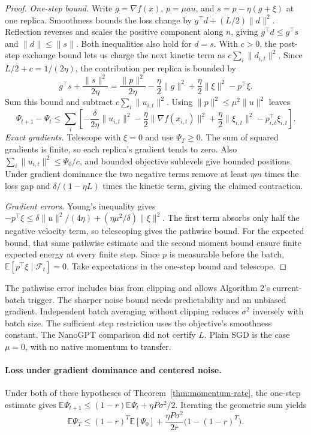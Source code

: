 \documentclass[10pt,letterpaper]{article}
\begin{document}
\begin{proof}
\textit{One-step bound.} Write \(g=\nabla f(x)\), \(p=\mu a u\), and \(s=p-\eta(g+\xi)\) at one replica. Smoothness bounds the loss change by \(g^\top d+(L/2)\|d\|^2\). Reflection reverses and scales the positive component along \(n\), giving \(g^\top d\le g^\top s\) and \(\|d\|\le\|s\|\). Both inequalities also hold for \(d=s\). With \(c>0\), the post-step exchange bound lets us charge the next kinetic term as \(c\sum_i\|d_{i,t}\|^2\). Since \(L/2+c=1/(2\eta)\), the contribution per replica is bounded by
\[
g^\top s+\frac{\|s\|^2}{2\eta}
=\frac{\|p\|^2}{2\eta}-\frac{\eta}{2}\|g\|^2
 +\frac{\eta}{2}\|\xi\|^2-p^\top\xi .
\]
Sum this bound and subtract \(c\sum_i\|u_{i,t}\|^2\). Using \(\|p\|^2\le\mu^2\|u\|^2\) leaves
\[
\Psi_{t+1}-\Psi_t
\le\sum_i\left[-\frac{\delta}{2\eta}\|u_{i,t}\|^2
-\frac{\eta}{2}\|\nabla f(x_{i,t})\|^2
+\frac{\eta}{2}\|\xi_{i,t}\|^2-p_{i,t}^\top\xi_{i,t}\right].
\]
\textit{Exact gradients.} Telescope with \(\xi=0\) and use \(\Psi_T\ge0\). The sum of squared gradients is finite, so each replica's gradient tends to zero. Also \(\sum_i\|u_{i,t}\|^2\le\Psi_0/c\), and bounded objective sublevels give bounded positions. Under gradient dominance the two negative terms remove at least \(\eta m\) times the loss gap and \(\delta/(1-\eta L)\) times the kinetic term, giving the claimed contraction.

\textit{Gradient errors.} Young's inequality gives \(-p^\top\xi\le\delta\|u\|^2/(4\eta)+(\eta\mu^2/\delta)\|\xi\|^2\). The first term absorbs only half the negative velocity term, so telescoping gives the pathwise bound. For the expected bound, that same pathwise estimate and the second moment bound ensure finite expected energy at every finite step. Since \(p\) is measurable before the batch, \(\mathbb E[p^\top\xi\mid\mathcal F_t]=0\). Take expectations in the one-step bound and telescope.
\end{proof}

The pathwise error includes bias from clipping and allows Algorithm 2's current-batch trigger. The sharper noise bound needs predictability and an unbiased gradient. Independent batch averaging without clipping reduces \(\sigma^2\) inversely with batch size. The sufficient step restriction uses the objective's smoothness constant. The NanoGPT comparison did not certify \(L\). Plain SGD is the case \(\mu=0\), with no native momentum to transfer.

\paragraph{Loss under gradient dominance and centered noise.}
Under both of these hypotheses of Theorem~\ref{thm:momentum-rate}, the one-step estimate gives \(\mathbb E\Psi_{t+1}\le(1-r)\mathbb E\Psi_t+\eta P\sigma^2/2\). Iterating the geometric sum yields
\[
\mathbb E\Psi_T\le(1-r)^T\mathbb E[\Psi_0]+
  \frac{\eta P\sigma^2}{2r}\bigl(1-(1-r)^T\bigr).
\]
\end{document}
